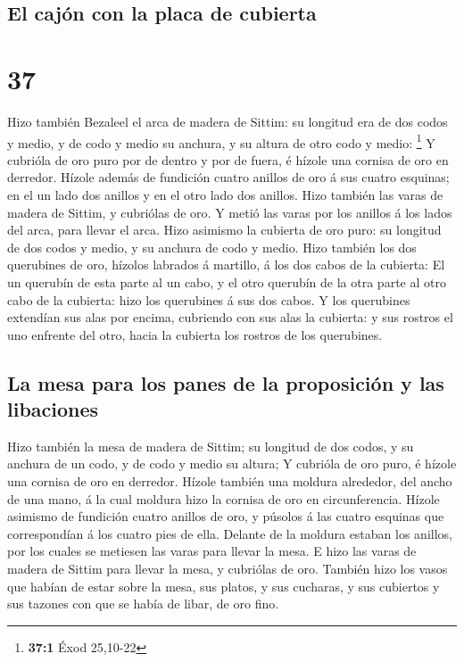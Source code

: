 \hypertarget{el-cajuxf3n-con-la-placa-de-cubierta}{%
\subsection{El cajón con la placa de
cubierta}\label{el-cajuxf3n-con-la-placa-de-cubierta}}

\hypertarget{section-36}{%
\section{37}\label{section-36}}

 Hizo también Bezaleel el arca de madera de Sittim: su
longitud era de dos codos y medio, y de codo y medio su anchura, y su
altura de otro codo y medio: \footnote{\textbf{37:1} Éxod 25,10-22}
 Y cubrióla de oro puro por de dentro y por de fuera, é
hízole una cornisa de oro en derredor.  Hízole además de
fundición cuatro anillos de oro á sus cuatro esquinas; en el un lado dos
anillos y en el otro lado dos anillos.  Hizo también las
varas de madera de Sittim, y cubriólas de oro.  Y metió
las varas por los anillos á los lados del arca, para llevar el arca.
 Hizo asimismo la cubierta de oro puro: su longitud de dos
codos y medio, y su anchura de codo y medio.  Hizo también
los dos querubines de oro, hízolos labrados á martillo, á los dos cabos
de la cubierta:  El un querubín de esta parte al un cabo,
y el otro querubín de la otra parte al otro cabo de la cubierta: hizo
los querubines á sus dos cabos.  Y los querubines
extendían sus alas por encima, cubriendo con sus alas la cubierta: y sus
rostros el uno enfrente del otro, hacia la cubierta los rostros de los
querubines.

\hypertarget{la-mesa-para-los-panes-de-la-proposiciuxf3n-y-las-libaciones}{%
\subsection{La mesa para los panes de la proposición y las
libaciones}\label{la-mesa-para-los-panes-de-la-proposiciuxf3n-y-las-libaciones}}

 Hizo también la mesa de madera de Sittim; su longitud de
dos codos, y su anchura de un codo, y de codo y medio su altura;
 Y cubrióla de oro puro, é hízole una cornisa de oro en
derredor.  Hízole también una moldura alrededor, del
ancho de una mano, á la cual moldura hizo la cornisa de oro en
circunferencia.  Hízole asimismo de fundición cuatro
anillos de oro, y púsolos á las cuatro esquinas que correspondían á los
cuatro pies de ella.  Delante de la moldura estaban los
anillos, por los cuales se metiesen las varas para llevar la mesa.
 E hizo las varas de madera de Sittim para llevar la
mesa, y cubriólas de oro.  También hizo los vasos que
habían de estar sobre la mesa, sus platos, y sus cucharas, y sus
cubiertos y sus tazones con que se había de libar, de oro fino.

